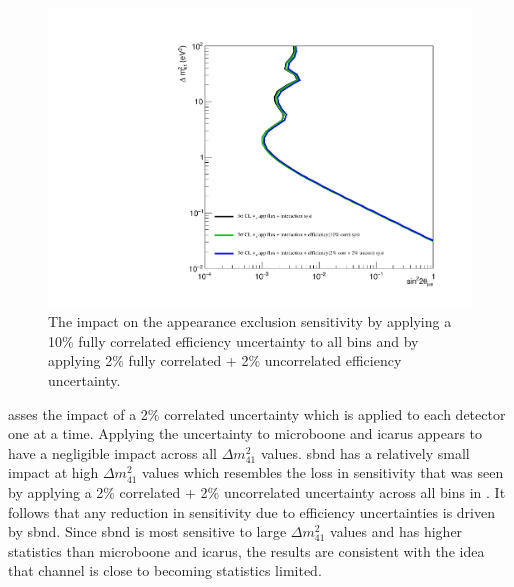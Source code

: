 \begin{figure}[h!]
    \centering
    \includegraphics[width = \largefigwidth]{figures-chap6/exclusion_contours/efficiency_systematics/nue_app_cor_uncor.pdf}
    \caption[Impact of correlated and uncorrelated efficiency systematics on the \nue appearance sensitivity.]{The impact on the \nue appearance exclusion sensitivity by applying a 10\% fully correlated efficiency uncertainty to all bins and by applying 2\% fully correlated + 2\% uncorrelated efficiency uncertainty.}
    \label{fig:nue_app_corr_uncorr_error}
\end{figure}

 asses the impact of a 2\% correlated uncertainty which is applied to each detector one at a time. Applying the uncertainty to \gls{microboone} and \gls{icarus} appears to have a negligible impact across all $\Delta m^2_{41}$ values. \gls{sbnd} has a relatively small impact at high $\Delta m^2_{41}$ values which resembles the loss in sensitivity that was seen by applying a 2\% correlated + 2\% uncorrelated uncertainty across all bins in . It follows that any reduction in sensitivity due to efficiency uncertainties is driven by \gls{sbnd}. Since \gls{sbnd} is most sensitive to large $\Delta m^2_{41}$ values and has higher statistics than \gls{microboone} and \gls{icarus}, the results are consistent with the idea that \nue channel is close to becoming statistics limited. 

